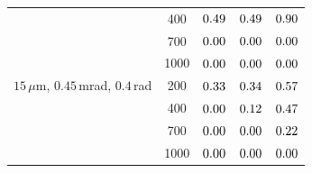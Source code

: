 \documentclass[11pt,a4paper]{article}
\begin{document}
\begin{table}[H]
\begin{tabular}{lcccc}
 & 400 & $0.49$ & $0.49$ & $0.90$\\
 & 700 & $0.00$ & $0.00$ & $0.00$\\
 & 1000 & $0.00$ & $0.00$ & $0.00$\\
\addlinespace
$15\,\mu$m, $0.45$\,mrad, $0.4$\,rad & 200 & $0.33$ & $0.34$ & $0.57$\\
 & 400 & $0.00$ & $0.12$ & $0.47$\\
 & 700 & $0.00$ & $0.00$ & $0.22$\\
 & 1000 & $0.00$ & $0.00$ & $0.00$\\
\bottomrule
\end{tabular}
\end{table}
\end{document}
